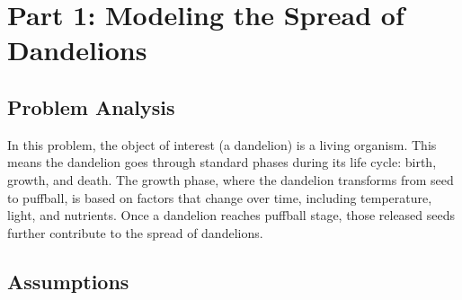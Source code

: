 \section{Part 1: Modeling the Spread of Dandelions}

\subsection{Problem Analysis}
In this problem, the object of interest (a dandelion) is a living organism. This means the dandelion goes through standard phases during its life cycle: birth, growth, and death. The growth phase, where the dandelion transforms from seed to puffball, is based on factors that change over time, including temperature, light, and nutrients. Once a dandelion reaches puffball stage, those released seeds further contribute to the spread of dandelions.

\subsection {Assumptions}


